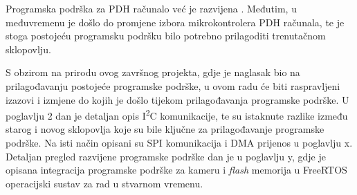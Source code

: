 Programska podrška za PDH računalo već je razvijena \cite{diplomski_goran_petrak}. Međutim, u međuvremenu je došlo do promjene izbora mikrokontrolera PDH računala, te je stoga postojeću programsku podršku bilo potrebno prilagoditi trenutačnom sklopovlju.

S obzirom na prirodu ovog završnog projekta, gdje je naglasak bio na prilagođavanju postojeće programske podrške, u ovom radu će biti raspravljeni izazovi i izmjene do kojih je došlo tijekom prilagođavanja programske podrške. U poglavlju 2 dan je detaljan opis I\textsuperscript{2}C komunikacije, te su istaknute razlike između starog i novog sklopovlja koje su bile ključne za prilagođavanje programske podrške. Na isti način opisani su SPI komunikacija i DMA prijenos u poglavlju x. Detaljan pregled razvijene programske podrške dan je u poglavlju y, gdje je opisana integracija programske podrške za kameru i \textit{flash} memorija u FreeRTOS operacijski sustav za rad u stvarnom vremenu.